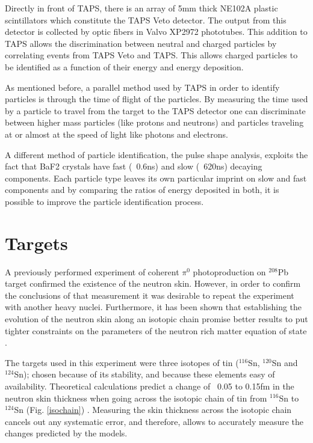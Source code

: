 \indent Directly  in  front  of  TAPS,  there  is  an  array  of  5mm  thick  NE102A  plastic scintillators which constitute the TAPS Veto detector. The output from this detector is collected by optic fibers in Valvo XP2972 phototubes. This addition to TAPS allows the discrimination between neutral and charged particles by correlating events from TAPS Veto and TAPS. This allows charged particles to be identified as a function of their energy and energy deposition.

\indent As mentioned before, a parallel method used by TAPS in order to identify particles is through the time of flight of the particles. By measuring  the  time used by a  particle to travel  from  the  target  to the TAPS detector one can discriminate between higher mass particles (like protons and neutrons) and particles traveling at or almost at the speed of light like photons and electrons.

\indent A different method of particle identification, the pulse shape analysis, exploits the fact  that  BaF2  crystals  have  fast  (~0.6ns)  and  slow  (~620ns)  decaying components. Each particle type leaves its own particular imprint on slow and fast components and by comparing the ratios of energy deposited in both, it is possible to improve the particle identification process.

\section{Targets}

\indent A previously performed experiment of coherent $\pi^{0}$ photoproduction on $^{208}$Pb target confirmed the existence of the neutron skin. However, in order to confirm the conclusions of that measurement it was desirable to repeat the experiment with another  heavy  nuclei.  Furthermore,  it  has  been shown  that establishing the evolution of the neutron skin  along  an isotopic  chain  promise  better  results  to  put  tighter constraints on the parameters of the neutron rich matter equation of state \cite{centelles}.

\indent The targets used in this experiment were three isotopes of tin ($^{116}$Sn, $^{120}$Sn and $^{124}$Sn); chosen because of its stability, and because these elements easy of availability. Theoretical  calculations  predict  a change of  ~0.05  to  0.15fm  in  the neutron  skin thickness when going across the isotopic chain of tin from $^{116}$Sn to $^{124}$Sn (Fig. \ref{isochain}) \cite{liewen}. Measuring the skin thickness across the  isotopic  chain  cancels  out  any systematic error,  and  therefore,  allows  to accurately measure the changes predicted by the models.


